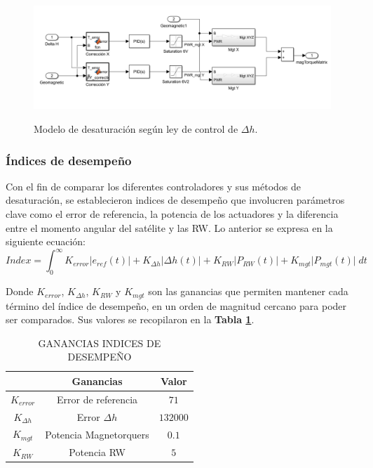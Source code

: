 \begin{figure}[!ht]
	\begin{center}
		\includegraphics[scale=0.45]{imagenes/controladores/PID_deltaH.PNG}\\
	\end{center}
	\caption{Modelo de desaturación según ley de control de $\Delta h$.}
	\label{fig:PID_deltaH}	 	
\end{figure} 	

\newpage
\subsubsection{Índices de desempeño}
\hfill \break
Con el fin de comparar los diferentes controladores y sus métodos de desaturación, se establecieron indices de desempeño que involucren parámetros clave como el error de referencia, la potencia de los actuadores y la diferencia entre el momento angular del satélite y las RW. Lo anterior se expresa en la siguiente ecuación:
\begin{equation}
	Index = \int_{0}^{\infty} K_{error}\lvert e_{ref}(t)\rvert + K_{\Delta h}\lvert \Delta h(t)\rvert +  K_{RW}\lvert P_{RW}(t)\rvert + K_{mgt}\lvert P_{mgt}(t)\rvert\;dt
\end{equation}

Donde $K_{error}$, $K_{\Delta h}$, $K_{RW}$ y $K_{mgt}$ son las ganancias que permiten mantener cada término del índice de desempeño, en un orden de magnitud cercano para poder ser comparados. Sus valores se recopilaron en la \textbf{Tabla \ref{table:ganancias_indices}}.

\begin{table}[h]
	\caption{\MakeUppercase{Ganancias indices de desempeño }}
	\begin{center}
		\begin{tabular}{ c c c}			
			&  \textbf{Ganancias} &  \textbf{Valor}\\ \hline
			$K_{error}$  &  Error de referencia & $71$ \\ 
			$K_{\Delta h}$ &  Error $\Delta h$ & $132000$ \\ 
			$K_{mgt}$ &  Potencia Magnetorquers & $0.1$ \\ 
			$K_{RW}$ &  Potencia RW & $5$ \\ \hline			
		\end{tabular}
	\end{center}
	\label{table:ganancias_indices}
\end{table}



